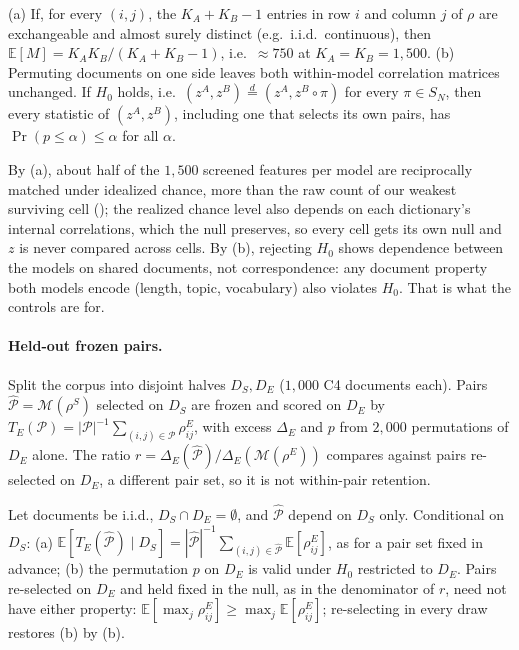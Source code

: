 \begin{proposition}\label{prop:null}
(a) If, for every $(i,j)$, the $K_A{+}K_B{-}1$ entries in row $i$ and column $j$ of $\rho$ are
exchangeable and almost surely distinct (e.g.\ i.i.d.\ continuous), then
$\mathbb{E}[M]=K_AK_B/(K_A{+}K_B{-}1)$, i.e.\ $\approx750$ at $K_A{=}K_B{=}1{,}500$.
(b) Permuting documents on one side leaves both within-model correlation matrices unchanged.
If $H_0$ holds, i.e.\ $(z^A,z^B)\overset{d}{=}(z^A,z^B\!\circ\pi)$ for every $\pi\in S_N$, then
every statistic of $(z^A,z^B)$, including one that selects its own pairs, has
$\Pr(p\le\alpha)\le\alpha$ for all $\alpha$.
\end{proposition}

By (a), about half of the $1{,}500$ screened features per model are reciprocally matched under
idealized chance, more than
the raw count of our weakest surviving cell (); the realized chance level also
depends on each dictionary's internal correlations, which the null preserves, so every cell gets
its own null and $z$ is never compared across cells. By (b), rejecting $H_0$ shows dependence
between the models on shared documents, not correspondence: any document property both models
encode (length, topic, vocabulary) also violates $H_0$. That is what the controls are for.

\paragraph{Held-out frozen pairs.} Split the corpus into disjoint halves $D_S,D_E$ ($1{,}000$
C4 documents each). Pairs $\widehat{\mathcal{P}}=\mathcal{M}(\rho^{S})$ selected on $D_S$ are
frozen and scored on $D_E$ by $T_E(\mathcal{P})=|\mathcal{P}|^{-1}\sum_{(i,j)\in\mathcal{P}}\rho^{E}_{ij}$,
with excess $\Delta_E$ and $p$ from $2{,}000$ permutations of $D_E$ alone. The ratio
$r=\Delta_E(\widehat{\mathcal{P}})/\Delta_E(\mathcal{M}(\rho^{E}))$ compares against pairs
re-selected on $D_E$, a different pair set, so it is not within-pair retention.

\begin{proposition}\label{prop:heldout}
Let documents be i.i.d., $D_S\cap D_E=\emptyset$, and $\widehat{\mathcal{P}}$ depend on $D_S$
only. Conditional on $D_S$: (a)
$\mathbb{E}[T_E(\widehat{\mathcal{P}})\mid D_S]=|\widehat{\mathcal{P}}|^{-1}
\sum_{(i,j)\in\widehat{\mathcal{P}}}\mathbb{E}[\rho^E_{ij}]$, as for a pair set fixed in advance;
(b) the permutation $p$ on $D_E$ is valid under $H_0$ restricted to $D_E$. Pairs re-selected on
$D_E$ and held fixed in the null, as in the denominator of $r$, need not have either property:
$\mathbb{E}[\max_j\rho^E_{ij}]\ge\max_j\mathbb{E}[\rho^E_{ij}]$; re-selecting in every draw
restores (b) by (b).
\end{proposition}

